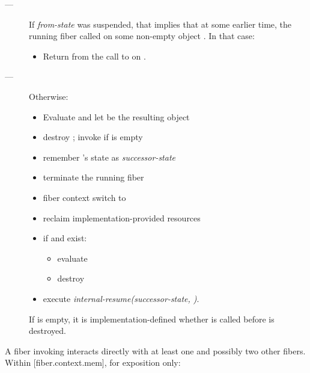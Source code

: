 \begin{description}
    \item[---]
        If \emph{from-state} was suspended, that implies that at some
        earlier time, the running fiber called \resumewith on some
        non-empty \fiber object . In that case:
        \begin{itemize}
            \item Return  from the call to \resumewith on .
        \end{itemize}   
    \item[---] Otherwise:
        \begin{itemize}
            \item Evaluate
                  and let  be the resulting \fiber object
            \item destroy ; invoke \termn if  is empty
            \item remember 's state as \emph{successor-state}
            \item terminate the running fiber
            \item fiber context switch to 
            \item reclaim implementation-provided resources
            \item if  and  exist:
                \begin{itemize}
                    \item evaluate 
                    \item destroy 
                \end{itemize}
            \item execute \emph{internal-resume(successor-state, )}.
        \end{itemize}

        If  is empty, it is implementation-defined
        whether \termn is called before  is destroyed.

\end{description}

A fiber invoking \resumewith interacts directly with at least one and possibly
two other fibers. Within [fiber.context.mem], for exposition only:

